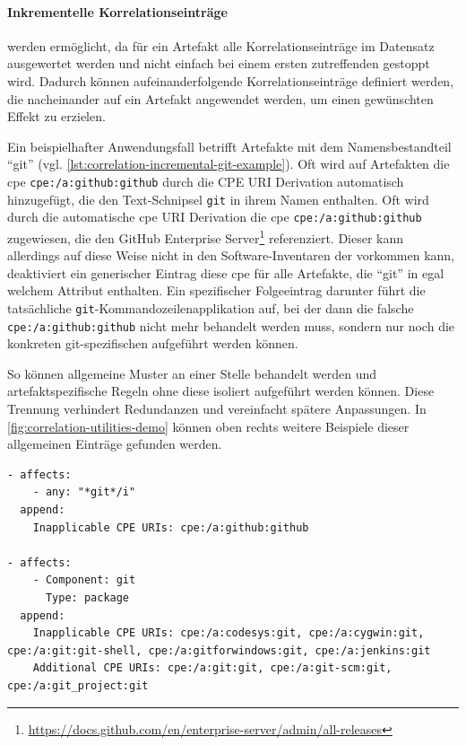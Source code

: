 \paragraph{Inkrementelle Korrelationseinträge}\label{par:incremental-correlation-entries}
werden ermöglicht, da für ein Artefakt alle Korrelationseinträge im Datensatz ausgewertet werden und nicht einfach bei einem ersten zutreffenden gestoppt wird.
Dadurch können aufeinanderfolgende Korrelationseinträge definiert werden, die nacheinander auf ein Artefakt angewendet werden, um einen gewünschten Effekt zu erzielen.

Ein beispielhafter Anwendungsfall betrifft Artefakte mit dem Namensbestandteil \enquote{git} (vgl. \autoref{lst:correlation-incremental-git-example}).
Oft wird auf Artefakten die \acrshort{cpe} \texttt{cpe:/a:github:github} durch die CPE URI Derivation automatisch hinzugefügt, die den Text-Schnipsel \texttt{git} in ihrem Namen enthalten.
Oft wird durch die automatische \acrshort{cpe} URI Derivation die \acrshort{cpe} \texttt{cpe:/a:github:github} zugewiesen, die den GitHub Enterprise Server\footnote{\url{https://docs.github.com/en/enterprise-server/admin/all-releases}} referenziert.
Dieser kann allerdings auf diese Weise nicht in den Software-Inventaren der \metaeffektsp vorkommen kann, deaktiviert ein generischer Eintrag diese \acrshort{cpe} für alle Artefakte, die \enquote{git} in egal welchem Attribut enthalten.
Ein spezifischer Folgeeintrag darunter führt die tatsächliche \texttt{git}-Kommandozeilenapplikation auf, bei der dann die falsche \texttt{cpe:/a:github:github} nicht mehr behandelt werden muss, sondern nur noch die konkreten git-spezifischen  aufgeführt werden können.

So können allgemeine Muster an einer Stelle behandelt werden und artefaktspezifische Regeln ohne diese isoliert aufgeführt werden können.
Diese Trennung verhindert Redundanzen und vereinfacht spätere Anpassungen.
In \autoref{fig:correlation-utilities-demo} können oben rechts weitere Beispiele dieser allgemeinen Einträge gefunden werden.

\begin{lstlisting}[style=yaml,caption={Inkrementelle Korrelationseinträge für das Kommandozeilentool git},label={lst:correlation-incremental-git-example}]
- affects:
    - any: "*git*/i"
  append:
    Inapplicable CPE URIs: cpe:/a:github:github

- affects:
    - Component: git
      Type: package
  append:
    Inapplicable CPE URIs: cpe:/a:codesys:git, cpe:/a:cygwin:git, cpe:/a:git:git-shell, cpe:/a:gitforwindows:git, cpe:/a:jenkins:git
    Additional CPE URIs: cpe:/a:git:git, cpe:/a:git-scm:git, cpe:/a:git_project:git
\end{lstlisting}

